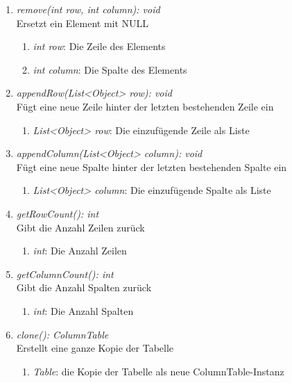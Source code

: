 \begin{enumerate}[+]
	\item \textit{remove(int row, int column): void} \\
	Ersetzt ein Element mit NULL
	\begin{enumerate}[$\bullet$]
		\item \textit{int row}: Die Zeile des Elements
		\item \textit{int column}: Die Spalte des Elements
	\end{enumerate}
	\vspace{-0.2cm}
	
	\item \textit{appendRow(List<Object> row): void} \\
	Fügt eine neue Zeile hinter der letzten bestehenden Zeile ein
	\begin{enumerate}[$\bullet$]
		\item \textit{List<Object> row}: Die einzufügende Zeile als Liste
	\end{enumerate}
	\vspace{-0.2cm}
	
	\item \textit{appendColumn(List<Object> column): void} \\
	Fügt eine neue Spalte hinter der letzten bestehenden Spalte ein
	\begin{enumerate}[$\bullet$]
		\item \textit{List<Object> column}: Die einzufügende Spalte als Liste
	\end{enumerate}
	\vspace{-0.2cm}
	
	\item \textit{getRowCount(): int} \\
	Gibt die Anzahl Zeilen zurück
	\vspace{-0.2cm}
	\begin{enumerate}[$\circ$]
		\item \textit{int}: Die Anzahl Zeilen
	\end{enumerate}
	
	\item \textit{getColumnCount(): int} \\
	Gibt die Anzahl Spalten zurück
	\vspace{-0.2cm}
	\begin{enumerate}[$\circ$]
		\item \textit{int}: Die Anzahl Spalten
	\end{enumerate}
	
	\item \textit{clone(): ColumnTable} \\
	Erstellt eine ganze Kopie der Tabelle
	\vspace{-0.2cm}
	\begin{enumerate}[$\circ$]
		\item \textit{Table}: die Kopie der Tabelle als neue ColumnTable-Instanz
	\end{enumerate}
	

\end{enumerate}
